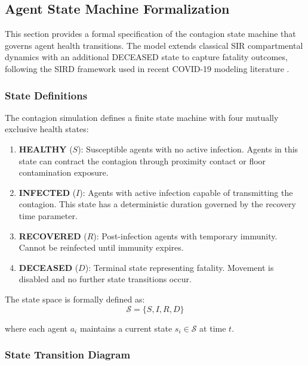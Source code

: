 \subsection{Agent State Machine Formalization}
\label{sec:state-machine}

This section provides a formal specification of the contagion state machine that governs agent health transitions. The model extends classical SIR compartmental dynamics \cite{kermack1927contribution} with an additional DECEASED state to capture fatality outcomes, following the SIRD framework used in recent COVID-19 modeling literature \cite{fanelli2020new, calafiore2020modified}.

\subsubsection{State Definitions}

The contagion simulation defines a finite state machine with four mutually exclusive health states:

\begin{enumerate}
    \item \textbf{HEALTHY} ($S$): Susceptible agents with no active infection. Agents in this state can contract the contagion through proximity contact or floor contamination exposure.
    \item \textbf{INFECTED} ($I$): Agents with active infection capable of transmitting the contagion. This state has a deterministic duration governed by the recovery time parameter.
    \item \textbf{RECOVERED} ($R$): Post-infection agents with temporary immunity. Cannot be reinfected until immunity expires.
    \item \textbf{DECEASED} ($D$): Terminal state representing fatality. Movement is disabled and no further state transitions occur.
\end{enumerate}

The state space is formally defined as:
\begin{equation}
\label{eq:state-space}
\mathcal{S} = \{S, I, R, D\}
\end{equation}

where each agent $a_i$ maintains a current state $s_i \in \mathcal{S}$ at time $t$.

\subsubsection{State Transition Diagram}

